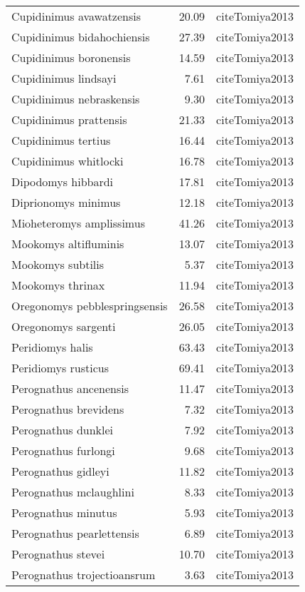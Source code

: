 \begin{table}[ht]
\begin{tabular}{lrl}
  Cupidinimus avawatzensis & 20.09 & cite{Tomiya2013} \\ 
  Cupidinimus bidahochiensis & 27.39 & cite{Tomiya2013} \\ 
  Cupidinimus boronensis & 14.59 & cite{Tomiya2013} \\ 
  Cupidinimus lindsayi & 7.61 & cite{Tomiya2013} \\ 
  Cupidinimus nebraskensis & 9.30 & cite{Tomiya2013} \\ 
  Cupidinimus prattensis & 21.33 & cite{Tomiya2013} \\ 
  Cupidinimus tertius & 16.44 & cite{Tomiya2013} \\ 
  Cupidinimus whitlocki & 16.78 & cite{Tomiya2013} \\ 
  Dipodomys hibbardi & 17.81 & cite{Tomiya2013} \\ 
  Diprionomys minimus & 12.18 & cite{Tomiya2013} \\ 
  Mioheteromys amplissimus & 41.26 & cite{Tomiya2013} \\ 
  Mookomys altifluminis & 13.07 & cite{Tomiya2013} \\ 
  Mookomys subtilis & 5.37 & cite{Tomiya2013} \\ 
  Mookomys thrinax & 11.94 & cite{Tomiya2013} \\ 
  Oregonomys pebblespringsensis & 26.58 & cite{Tomiya2013} \\ 
  Oregonomys sargenti & 26.05 & cite{Tomiya2013} \\ 
  Peridiomys halis & 63.43 & cite{Tomiya2013} \\ 
  Peridiomys rusticus & 69.41 & cite{Tomiya2013} \\ 
  Perognathus ancenensis & 11.47 & cite{Tomiya2013} \\ 
  Perognathus brevidens & 7.32 & cite{Tomiya2013} \\ 
  Perognathus dunklei & 7.92 & cite{Tomiya2013} \\ 
  Perognathus furlongi & 9.68 & cite{Tomiya2013} \\ 
  Perognathus gidleyi & 11.82 & cite{Tomiya2013} \\ 
  Perognathus mclaughlini & 8.33 & cite{Tomiya2013} \\ 
  Perognathus minutus & 5.93 & cite{Tomiya2013} \\ 
  Perognathus pearlettensis & 6.89 & cite{Tomiya2013} \\ 
  Perognathus stevei & 10.70 & cite{Tomiya2013} \\ 
  Perognathus trojectioansrum & 3.63 & cite{Tomiya2013} \\ 

\end{tabular}
\end{table}
